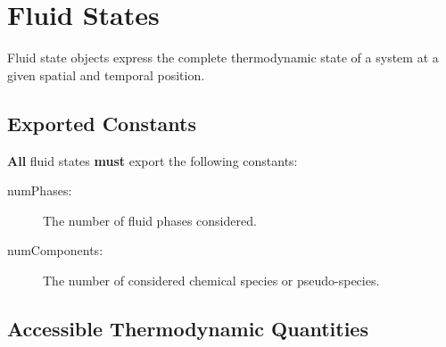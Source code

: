 \section{Fluid States}

Fluid state objects express the complete thermodynamic state of a
system at a given spatial and temporal position. 

\subsection{Exported Constants}

{\bf All} fluid states {\bf must} export the following constants:
\begin{description}
\item[numPhases:] The number of fluid phases considered.
\item[numComponents:] The number of considered chemical
  species or pseudo-species.
\end{description}

\subsection{Accessible Thermodynamic Quantities}

